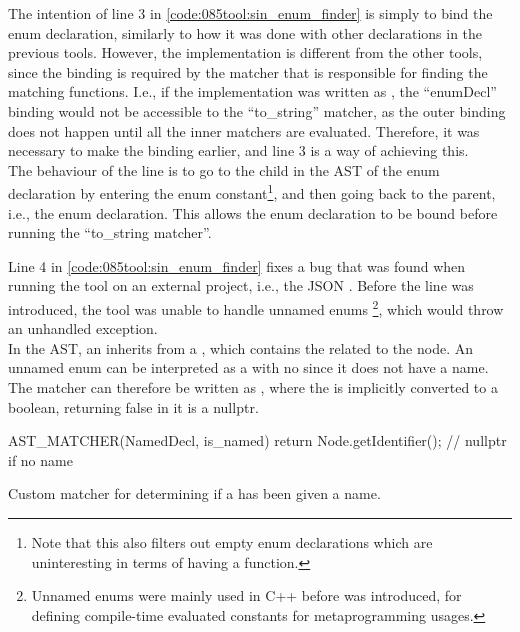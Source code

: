 The intention of line 3 in \cref{code:085tool:sin_enum_finder} is simply to bind the enum declaration, similarly to how it was done with other declarations in the previous tools.
However, the implementation is different from the other tools, since the binding is required by the matcher that is responsible for finding the matching  functions.
I.e., if the implementation was written as , the ``enumDecl'' binding would not be accessible to the ``to\_string'' matcher, as the outer binding does not happen until all the inner matchers are evaluated.
Therefore, it was necessary to make the binding earlier, and line 3 is a way of achieving this.\\
The behaviour of the line is to go to the child in the AST of the enum declaration by entering the enum constant\footnote{
    Note that this also filters out empty enum declarations which are uninteresting in terms of having a  function.
}, and then going back to the parent, i.e., the enum declaration. This allows the enum declaration to be bound before running the ``to\_string matcher''.

Line 4 in \cref{code:085tool:sin_enum_finder} fixes a bug that was found when running the tool on an external project, i.e., the JSON \cite{Lohmann22}.
Before the line was introduced, the tool was unable to handle unnamed enums
\footnote{
    Unnamed enums were mainly used in C++ before  was introduced, for defining compile-time evaluated constants for metaprogramming usages.
}, which would throw an unhandled exception.\\
In the AST, an  inherits from a , which contains the  related to the node.
An unnamed enum can be interpreted as a  with no  since it does not have a name.
The matcher can therefore be written as , where the  is implicitly converted to a boolean, returning false in it is a nullptr.

\begin{listing}[H]
    \begin{cppcode}
AST_MATCHER(NamedDecl, is_named) {
	return Node.getIdentifier(); // nullptr if no name
}
    \end{cppcode}
    \caption{Custom matcher for determining if a  has been given a name.}
    \label{code:085tool:sin_is_named}
\end{listing}

